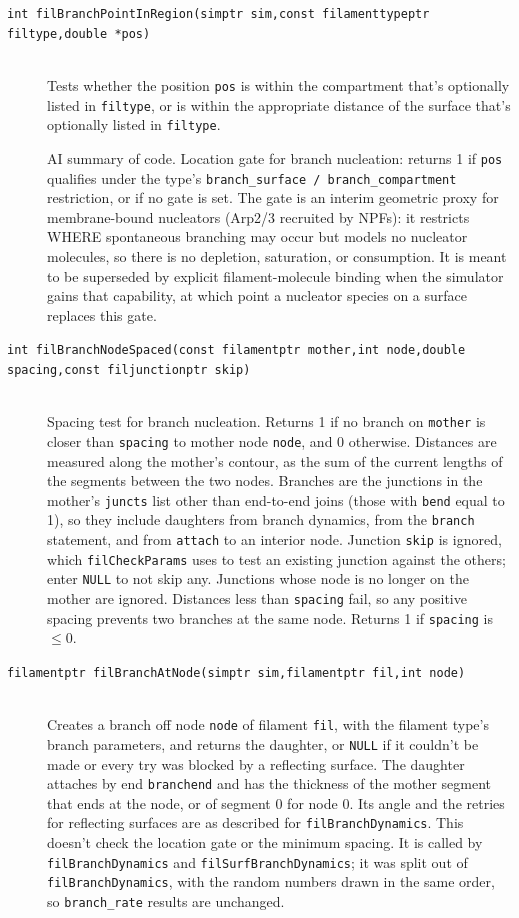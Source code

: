 \documentclass {scrbook}
\newcommand {\ttt} {\texttt}
\begin{document}
\begin{description}
\item[\ttt{int filBranchPointInRegion(simptr sim,const filamenttypeptr filtype,double *pos)}] %
\hfill \\
Tests whether the position \ttt{pos} is within the compartment that's optionally listed in \ttt{filtype}, or is within the appropriate distance of the surface that's optionally listed in \ttt{filtype}.

AI summary of code. Location gate for branch nucleation: returns 1 if \ttt{pos} qualifies under the type's \ttt{branch\_surface / branch\_compartment} restriction, or if no gate is set. The gate is an interim geometric proxy for membrane-bound nucleators (Arp2/3 recruited by NPFs): it restricts WHERE spontaneous branching may occur but models no nucleator molecules, so there is no depletion, saturation, or consumption. It is meant to be superseded by explicit filament-molecule binding when the simulator gains that capability, at which point a nucleator species on a surface replaces this gate.

\item[\ttt{int filBranchNodeSpaced(const filamentptr mother,int node,double spacing,const filjunctionptr skip)}]
\hfill \\
Spacing test for branch nucleation. Returns 1 if no branch on \ttt{mother} is closer than \ttt{spacing} to mother node \ttt{node}, and 0 otherwise. Distances are measured along the mother's contour, as the sum of the current lengths of the segments between the two nodes. Branches are the junctions in the mother's \ttt{juncts} list other than end-to-end joins (those with \ttt{bend} equal to 1), so they include daughters from branch dynamics, from the \ttt{branch} statement, and from \ttt{attach} to an interior node. Junction \ttt{skip} is ignored, which \ttt{filCheckParams} uses to test an existing junction against the others; enter \ttt{NULL} to not skip any. Junctions whose node is no longer on the mother are ignored. Distances less than \ttt{spacing} fail, so any positive spacing prevents two branches at the same node. Returns 1 if \ttt{spacing} is $\leq 0$. %

\item[\ttt{filamentptr filBranchAtNode(simptr sim,filamentptr fil,int node)}] %
\hfill \\
Creates a branch off node \ttt{node} of filament \ttt{fil}, with the filament type's branch parameters, and returns the daughter, or \ttt{NULL} if it couldn't be made or every try was blocked by a reflecting surface. The daughter attaches by end \ttt{branchend} and has the thickness of the mother segment that ends at the node, or of segment 0 for node 0. Its angle and the retries for reflecting surfaces are as described for \ttt{filBranchDynamics}. This doesn't check the location gate or the minimum spacing. It is called by \ttt{filBranchDynamics} and \ttt{filSurfBranchDynamics}; it was split out of \ttt{filBranchDynamics}, with the random numbers drawn in the same order, so \ttt{branch\_rate} results are unchanged.


\end{description}
\end{document}
